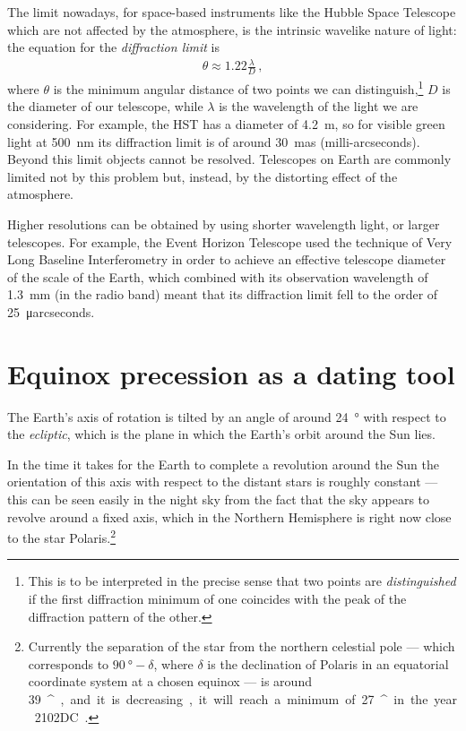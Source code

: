 \documentclass[main.tex]{subfiles}
\begin{document}
The limit nowadays, for space-based instruments like the Hubble Space Telescope which are not affected by the atmosphere, is the intrinsic wavelike nature of light: the equation for the \emph{diffraction limit} is 
%
\begin{align}
\theta \approx \num{1.22} \frac{\lambda }{D}
\,,
\end{align}
%
where \(\theta \) is the minimum angular distance of two points we can distinguish,\footnote{This is to be interpreted in the precise sense that two points are \emph{distinguished} if the first diffraction minimum of one coincides with the peak of the diffraction pattern of the other.} \(D\) is the diameter of our telescope, while \(\lambda \) is the wavelength of the light we are considering.
For example, the HST has a diameter of \SI{4.2}{m}, so for visible green light at \SI{500}{nm} its diffraction limit is of around \SI{30}{mas} (milli-arcseconds).
Beyond this limit objects cannot be resolved. 
Telescopes on Earth are commonly limited not by this problem but, instead, by the distorting effect of the atmosphere. 

Higher resolutions can be obtained by using shorter wavelength light, or larger telescopes. 
For example, the Event Horizon Telescope \cite[]{theeventhorizontelescopecollaborationFirstM87Event2019} used the technique of Very Long Baseline Interferometry in order to achieve an effective telescope diameter of the scale of the Earth, which combined with its observation wavelength of \SI{1.3}{mm} (in the radio band) meant that its diffraction limit fell to the order of \SI{25}{\micro arcseconds}.

\section{Equinox precession as a dating tool}

The Earth's axis of rotation is tilted by an angle of around \SI{24}{\degree} with respect to the \emph{ecliptic}, which is the plane in which the Earth's orbit around the Sun lies. 

In the time it takes for the Earth to complete a revolution around the Sun the orientation of this axis with respect to the distant stars is roughly constant --- this can be seen easily in the night sky from the fact that the sky appears to revolve around a fixed axis, which in the Northern Hemisphere is right now close to the star Polaris.\footnote{Currently the separation of the star from the northern celestial pole --- which corresponds to \(\SI{90}{\degree} - \delta \), where \(\delta \) is the declination of Polaris in an equatorial coordinate system at a chosen equinox --- is around \SI{39}{^\prime}, and it is decreasing, it will reach a minimum of \SI{27}{^\prime} in the year 2102DC \cite[pag.\ 58]{barbieriLezioniDiAstronomia2003}.}
\end{document}
